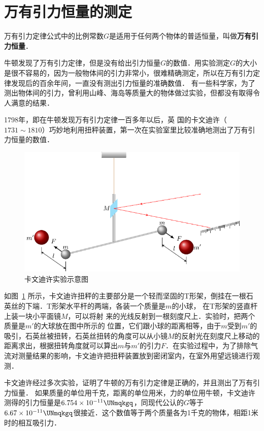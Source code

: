 \section{万有引力恒量的测定}
万有引力定律公式中的比例常数$G$是适用于任何两个物体的普适恒量，叫做\textbf{万有引力恒量}．

牛顿发现了万有引力定律，但是没有给出引力恒量$G$的数值．用实验测定$G$的大小是很不容易的，因为一般物体间的引力非常小，很难精确测定，所以在万有引力定律发现后的百余年间，一直没有测出引力恒量的准确数值．
有一些科学家，为了测出物体间的引力，曾利用山峰、海岛等质量大的物体做过实验，但都没有取得令人满意的结果．

1798年，即在牛顿发现万有引力定律一百多年以后，英
国的卡文迪许（$1731 \sim 1810$）巧妙地利用扭秤装置，第一次在实验室里比较准确地测出了万有引力恒量的数值．

\begin{figure}[htbp]
	\centering
	\includegraphics{fig/A/5-3.pdf}
	\caption{卡文迪许实验示意图}\label{fig_A_5-3}
\end{figure}

如图~\ref{fig_A_5-3} 所示，卡文迪许扭秤的主要部分是一个轻而坚固的T形架，倒挂在一根石英丝的下端．T形架水平杆的两端，各装一个质量是$m$的小球，
在T形架的竖直杆上装一块小平面镜$M$，可以将射
来的光线反射到一根刻度尺上．实验时，把两个质量是$m'$的大球放在图中所示的
位置，它们跟小球的距离相等，由于$m$受到$m'$的吸引，石英丝被扭转，石英丝扭转的角度可以从小镜$M$的反射光在刻度尺上移动的距离求出，根据扭转角度就可以算出$m$与$m'$的引力$F$．在实验过程中，为了排除气流对测量结果的影响，卡文迪许把扭秤装置放到密闭室内，在室外用望远镜进行观测．

卡文迪许经过多次实验，证明了牛顿的万有引力定律是正确的，并且测出了万有引力恒量．
如果质量的单位用千克，距离的单位用米，力的单位用牛顿，卡文迪许测得的引力恒量是$6.754\times 10^{-11} \UNmqkgq$，同现代公认的$G$等于$6.67\times 10^{-11}\UNmqkgq$很接近．这个数值等于两个质量各为1千克的物体，相距1米时的相互吸引力．

